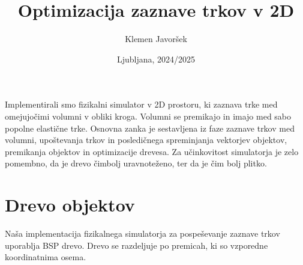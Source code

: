 \documentclass[a4paper,12pt]{article}
\begin{document}
\begin{titlepage}    
    \title{\Huge Optimizacija zaznave trkov v 2D}
    \author{Klemen Javoršek}
    \date{Ljubljana, 2024/2025}
    \maketitle
    \renewcommand{\headrulewidth}{0cm}
    \fancyhf{}
    \thispagestyle{fancy}
\end{titlepage}

\newpage    
\setcounter{page}{1}
\tableofcontents
\newpage


Implementirali smo fizikalni simulator v 2D prostoru, ki zaznava trke med omejujočimi volumni
v obliki kroga. Volumni se premikajo in imajo med sabo popolne elastične trke.
Osnovna zanka je sestavljena iz faze zaznave trkov med volumni, upoštevanja trkov in posledičnega
spreminjanja vektorjev objektov, premikanja objektov in optimizacije drevesa. Za učinkovitost
simulatorja je zelo pomembno, da je drevo čimbolj uravnoteženo, ter da je čim bolj plitko.
\section{Drevo objektov}
Naša implementacija fizikalnega simulatorja za pospeševanje zaznave trkov uporablja BSP drevo.
Drevo se razdeljuje po premicah, ki so vzporedne koordinatnima osema.

\end{document}
